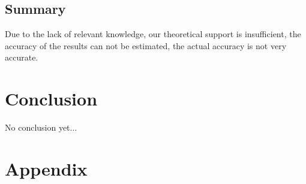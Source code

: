 \documentclass[conference,compsoc]{appendix/report}
\begin{document}
\subsection{Summary}
Due to the lack of relevant knowledge, our theoretical support is insufficient, the accuracy of the results can not be estimated, the actual accuracy is not very accurate.


\section{Conclusion}
No conclusion yet...


\section{Appendix}
\end{document}
